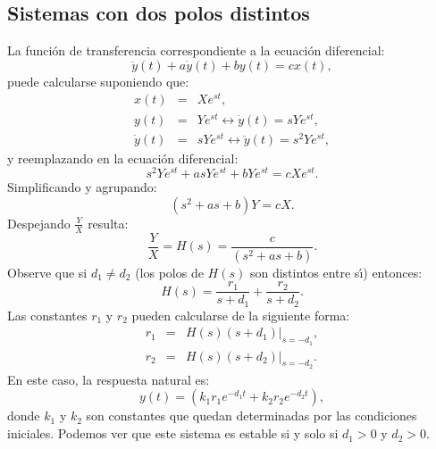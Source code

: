 \documentclass[11pt,a4paper,openany]{book}
\begin{document}
\subsection{Sistemas con dos polos distintos}

La funci\'{o}n de transferencia correspondiente a la ecuaci\'{o}n diferencial:
\begin{equation}
	\ddot{y}\left( t\right) +a\dot{y}\left( t\right) +by\left( t\right) = cx\left( t\right) ,
\end{equation}
puede calcularse suponiendo que:
\begin{eqnarray}
	x\left( t\right)        &=& X e^{st}, \\
	y\left( t\right)        &=& Y e^{st} \longleftrightarrow \dot{y}\left( t\right) = s Y e^{st}, \\
	\dot{y}\left( t\right)  &=& s Y e^{st} \longleftrightarrow \ddot{y}\left(t\right) = s^{2} Y e^{st},
\end{eqnarray}
y reemplazando en la ecuaci\'{o}n diferencial:
\begin{equation}
	s^{2} Y e^{st} + a s Y e^{st} + b Y e^{st} = c X e^{st}.
\end{equation}
Simplificando y agrupando:
\begin{equation}
	\left( s^{2}+as+b\right) Y = c X.
\end{equation}
Despejando $\frac{Y}{X}$ resulta: 
\begin{equation}
	\frac{Y}{X} = H\left( s\right) = \frac{c}{\left( s^{2}+as+b\right) }.
\end{equation}
Observe que si $d_{1}\neq d_{2}$ (los polos de $H(s)$ son distintos entre s\'{\i}) entonces: 
\begin{equation}
	H\left( s\right) = \frac{r_{1}}{s+d_{1}} + \frac{r_{2}}{s+d_{2}}.
\end{equation}
Las constantes $r_{1}$ y $r_{2}$ pueden calcularse de la siguiente forma:
\begin{eqnarray}
	r_{1} &=& \left. H(s) (s+d_{1}) \right|_{s=-d_{1}}, \\
	r_{2} &=& \left. H(s) (s+d_{2}) \right|_{s=-d_{2}}.
\end{eqnarray}
En este caso, la respuesta natural es: 
\begin{equation}
	y\left( t\right) = \left( k_{1} r_{1} e^{-d_{1}t} + k_{2} r_{2} e^{-d_{2}t}\right) ,
\end{equation}
donde $k_{1}$ y $k_{2}$ son constantes que quedan determinadas por las condiciones iniciales. Podemos ver que este sistema es estable si y solo si $d_{1} > 0$ y $d_{2} > 0$.
\end{document}

